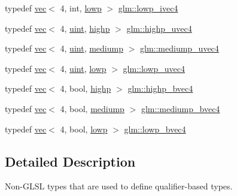 \begin{DoxyCompactItemize}
typedef \mbox{\hyperlink{structglm_1_1vec}{vec}}$<$ 4, int, \mbox{\hyperlink{namespaceglm_a36ed105b07c7746804d7fdc7cc90ff25ae161af3fc695e696ce3bf69f7332bc2d}{lowp}} $>$ \mbox{\hyperlink{group__core__precision_ga67d57bf0fc189f8153c7c60ad80ec981}{glm\+::lowp\+\_\+ivec4}}
\item 
typedef \mbox{\hyperlink{structglm_1_1vec}{vec}}$<$ 4, \mbox{\hyperlink{group__core__precision_ga4fd29415871152bfb5abd588334147c8}{uint}}, \mbox{\hyperlink{namespaceglm_a36ed105b07c7746804d7fdc7cc90ff25ac6f7eab42eacbb10d59a58e95e362074}{highp}} $>$ \mbox{\hyperlink{group__core__precision_gae48d6e9a99afc33e6fa51e5d576dfd1a}{glm\+::highp\+\_\+uvec4}}
\item 
typedef \mbox{\hyperlink{structglm_1_1vec}{vec}}$<$ 4, \mbox{\hyperlink{group__core__precision_ga4fd29415871152bfb5abd588334147c8}{uint}}, \mbox{\hyperlink{namespaceglm_a36ed105b07c7746804d7fdc7cc90ff25a6416f3ea0c9025fb21ed50c4d6620482}{mediump}} $>$ \mbox{\hyperlink{group__core__precision_ga204494f26e258e26882acf5288415ebd}{glm\+::mediump\+\_\+uvec4}}
\item 
typedef \mbox{\hyperlink{structglm_1_1vec}{vec}}$<$ 4, \mbox{\hyperlink{group__core__precision_ga4fd29415871152bfb5abd588334147c8}{uint}}, \mbox{\hyperlink{namespaceglm_a36ed105b07c7746804d7fdc7cc90ff25ae161af3fc695e696ce3bf69f7332bc2d}{lowp}} $>$ \mbox{\hyperlink{group__core__precision_ga0ecd5668a8e001e14a9dab2cffd09285}{glm\+::lowp\+\_\+uvec4}}
\item 
typedef \mbox{\hyperlink{structglm_1_1vec}{vec}}$<$ 4, bool, \mbox{\hyperlink{namespaceglm_a36ed105b07c7746804d7fdc7cc90ff25ac6f7eab42eacbb10d59a58e95e362074}{highp}} $>$ \mbox{\hyperlink{group__core__precision_gaa99e0301060bf06e7750c1c3591b6b4e}{glm\+::highp\+\_\+bvec4}}
\item 
typedef \mbox{\hyperlink{structglm_1_1vec}{vec}}$<$ 4, bool, \mbox{\hyperlink{namespaceglm_a36ed105b07c7746804d7fdc7cc90ff25a6416f3ea0c9025fb21ed50c4d6620482}{mediump}} $>$ \mbox{\hyperlink{group__core__precision_ga064ca037c066a4d47ab6d34c2cf0ae2f}{glm\+::mediump\+\_\+bvec4}}
\item 
typedef \mbox{\hyperlink{structglm_1_1vec}{vec}}$<$ 4, bool, \mbox{\hyperlink{namespaceglm_a36ed105b07c7746804d7fdc7cc90ff25ae161af3fc695e696ce3bf69f7332bc2d}{lowp}} $>$ \mbox{\hyperlink{group__core__precision_ga9c156bdb6dd02d35826ee77094ff3cdf}{glm\+::lowp\+\_\+bvec4}}
\end{DoxyCompactItemize}


\subsection{Detailed Description}
Non-\/\+G\+L\+SL types that are used to define qualifier-\/based types. 

